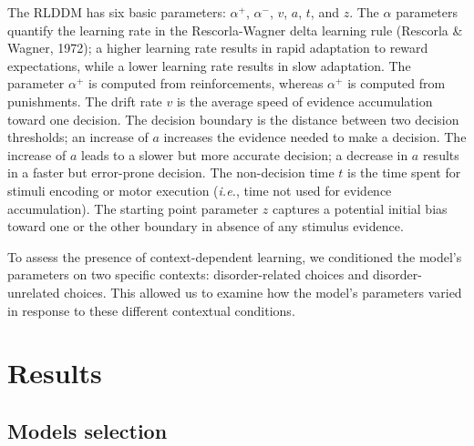 \documentclass[
  man,floatsintext]{apa6}
\begin{document}
The RLDDM has six basic parameters: \(\alpha^+\), \(\alpha^-\), \(v\), \(a\), \(t\), and \(z\).
The \(\alpha\) parameters quantify the learning rate in the Rescorla-Wagner delta learning rule (Rescorla \& Wagner, 1972); a higher learning rate results in rapid adaptation to reward expectations, while a lower learning rate results in slow adaptation. The parameter \(\alpha^+\) is computed from reinforcements, whereas \(\alpha^+\) is computed from punishments. The drift rate \(v\) is the average speed of evidence accumulation toward one decision. The decision boundary is the distance between two decision thresholds; an increase of \(a\) increases the evidence needed to make a decision. The increase of \(a\) leads to a slower but more accurate decision; a decrease in \(a\) results in a faster but error-prone decision. The non-decision time \(t\) is the time spent for stimuli encoding or motor execution (\emph{i.e.}, time not used for evidence accumulation). The starting point parameter \(z\) captures a potential initial bias toward one or the other boundary in absence of any stimulus evidence.

To assess the presence of context-dependent learning, we conditioned the model's parameters on two specific contexts: disorder-related choices and disorder-unrelated choices. This allowed us to examine how the model's parameters varied in response to these different contextual conditions.

\hypertarget{results}{%
\section{Results}\label{results}}

\hypertarget{models-selection}{%
\subsection{Models selection}\label{models-selection}}
\end{document}
